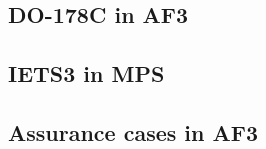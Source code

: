 \subsection{DO-178C in AF3}

\subsection{IETS3 in MPS}
\label{sec:meta}


\subsection{Assurance cases in AF3}
